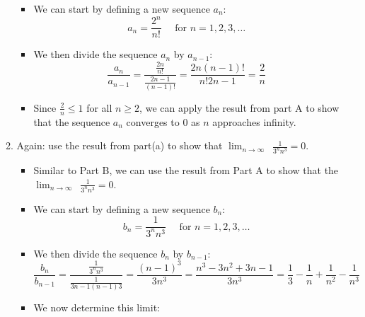 \documentclass[12pt]{report}
\begin{document}
\begin{enumerate}[leftmargin=\labelsep]
\begin{enumerate}
\begin{tcolorbox}
\begin{itemize}[label={}]
                        \item We can start by defining a new sequence $a_n$:
                        \begin{equation*}
                            a_n = \frac{2^n}{n!} \quad \text{ for } n=1,2,3,\dots
                        \end{equation*}
                        \item We then divide the sequence $a_n$ by $a_{n-1}$:
                        \begin{equation*} \frac{a_n}{a_{n-1}} = \frac{\frac{2n}{n!}}{\frac{2{n-1}}{(n-1)!}} = \frac{2n(n-1)!}{n!2{n-1}} = \frac{2}{n} 
                        \end{equation*}
                        \item Since $\frac{2}{n} \leq 1$ for all $n \geq 2$, we can apply the result from part A to show that the sequence $a_n$ converges to 0 as $n$ approaches infinity.
                    \end{itemize}
                \end{tcolorbox}
            \item Again: use the result from part(a) to show that $\displaystyle{\lim_{n \to \infty}}\,\,\, \frac{1}{3^nn^3}=0$.
                    \begin{tcolorbox}
                        \begin{itemize}[label={}]
                            \item Similar to Part B, we can use the result from Part A to show that the $\displaystyle{\lim_{n \to \infty}}\,\,\, \frac{1}{3^nn^3}=0$.
                            \item We can start by defining a new sequence $b_n$:
                            \begin{equation*}
                                b_n = \frac{1}{3^nn^3} \quad \text{ for } n=1,2,3,\dots
                            \end{equation*}
                            \item We then divide the sequence $b_n$ by $b_{n-1}$:
                            \begin{equation*} \frac{b_n}{b_{n-1}} = \frac{\frac{1}{3^nn^3}}{\frac{1}{3{n-1}(n-1)3}} = \frac{(n-1)^3}{3n^3} = \frac{n^3-3n^2+3n-1}{3n^3} = \frac{1}{3} - \frac{1}{n} + \frac{1}{n^2} - \frac{1}{n^3} 
                            \end{equation*}
                            \item We now determine this limit:

\end{itemize}
\end{tcolorbox}
\end{enumerate}
\end{enumerate}
\end{document}
